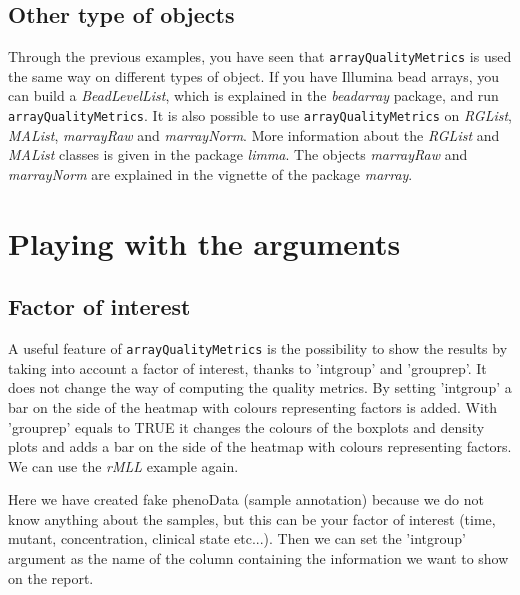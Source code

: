 \documentclass[a4paper]{article}
\newcommand{\Rpackage}[1]{\textit{#1}}
\newcommand{\Rclass}[1]{\textit{#1}}
\newcommand{\Rfunction}[1]{{\small\texttt{#1}}}
\begin{document}
\subsection{Other type of objects}
Through the previous examples, you have seen that \Rfunction{arrayQualityMetrics} is used the same way on different types of object.
If you have Illumina bead arrays, you can build a \Rclass{BeadLevelList}, which is explained in the \Rpackage{beadarray} package, and run \Rfunction{arrayQualityMetrics}.
It is also possible to use \Rfunction{arrayQualityMetrics} on \Rclass{RGList}, \Rclass{MAList}, \Rclass{marrayRaw} and \Rclass{marrayNorm}. More information about the \Rclass{RGList} and \Rclass{MAList} classes is given in the package \Rpackage{limma}. The objects \Rclass{marrayRaw} and  \Rclass{marrayNorm} are explained in the vignette of the package \Rpackage{marray}.

\section{Playing with the arguments}

\subsection{Factor of interest}

A useful feature of \Rfunction{arrayQualityMetrics} is the possibility to show the results by taking into account a factor of interest, thanks to 'intgroup' and 'grouprep'. It does not change the way of computing the quality metrics. By setting 'intgroup' a bar on the side of the heatmap with colours representing factors is added. With 'grouprep' equals to TRUE it changes the colours of the boxplots and density plots and adds a bar on the side of the heatmap with colours representing factors.
We can use the \emph{rMLL} example again.

%
\begin{Schunk}
\end{Schunk}
%

Here we have created fake phenoData (sample annotation) because we do not know anything about the samples, but this can be your factor of interest (time, mutant, concentration, clinical state etc...). Then we can set the 'intgroup' argument as the name of the column containing the information we want to show on the report.
\end{document}
